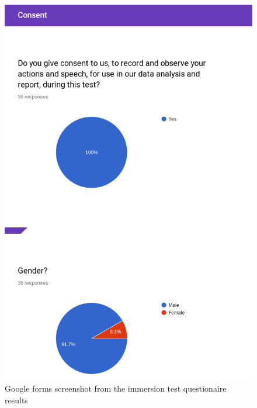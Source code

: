 \begin{multicols}{2}
\begin{figure}[H]
		\includegraphics[width=1.0\linewidth]{include/Appendices/immersionQuestionnaire/2.png}
		\caption{Google forms screenshot from the immersion test questionaire results}
	\end{figure}
	\begin{figure}[H]

\end{figure}
\end{multicols}
